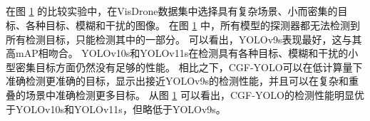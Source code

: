 \begin{figure}[H]
    \centering
        \\
        \\
        \\
        \\
    \captionsetup{font=footnotesize}
    \label{fig:fogvd_1}
\end{figure}

在图 \ref{fig:fogvd_1} 的比较实验中，在VisDrone数据集中选择具有复杂场景、小而密集的目标、各种目标、模糊和干扰的图像。
在图 \ref{fig:fogvd_1} 中，所有模型的探测器都无法检测到所有检测目标，只能检测其中的一部分。 可以看出，YOLOv9s表现最好，这与其高mAP相吻合。 YOLOv10s和YOLOv11s在检测具有各种目标、模糊和干扰的小型密集目标方面仍然没有足够的性能。 相比之下，CGF-YOLO可以在低计算量下准确检测更准确的目标，显示出接近YOLOv9s的检测性能，并且可以在复杂和重叠的场景中准确检测更多目标。 从图 \ref{fig:fogvd_1} 可以看出，CGF-YOLO的检测性能明显优于YOLOv10s和YOLOv11s，但略低于YOLOv9s。



